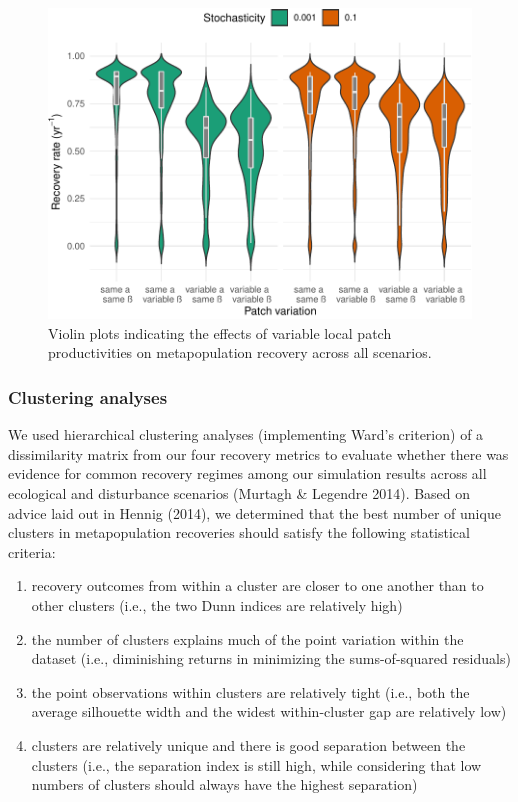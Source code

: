 \documentclass[
]{article}
\providecommand{\tightlist}{%
  \setlength{\itemsep}{0pt}\setlength{\parskip}{0pt}}
\begin{document}
\begin{figure}[H]

{\centering \includegraphics{Managing_for_ecological_surprises_in_metapopulations_files/figure-latex/recovery with patch variation-1} 

}

\caption{Violin plots indicating the effects of variable local patch productivities on metapopulation recovery across all scenarios.}\label{fig:recovery with patch variation}
\end{figure}
\newpage

\hypertarget{clustering-analyses}{%
\subsubsection{Clustering analyses}\label{clustering-analyses}}

We used hierarchical clustering analyses (implementing Ward's criterion)
of a dissimilarity matrix from our four recovery metrics to evaluate
whether there was evidence for common recovery regimes among our
simulation results across all ecological and disturbance scenarios
(Murtagh \& Legendre 2014). Based on advice laid out in Hennig (2014),
we determined that the best number of unique clusters in metapopulation
recoveries should satisfy the following statistical criteria:

\begin{enumerate}
\def\labelenumi{\arabic{enumi}.}
\tightlist
\item
  recovery outcomes from within a cluster are closer to one another than
  to other clusters (i.e., the two Dunn indices are relatively high)
\item
  the number of clusters explains much of the point variation within the
  dataset (i.e., diminishing returns in minimizing the sums-of-squared
  residuals)
\item
  the point observations within clusters are relatively tight (i.e.,
  both the average silhouette width and the widest within-cluster gap
  are relatively low)
\item
  clusters are relatively unique and there is good separation between
  the clusters (i.e., the separation index is still high, while
  considering that low numbers of clusters should always have the
  highest separation)
\end{enumerate}
\end{document}
